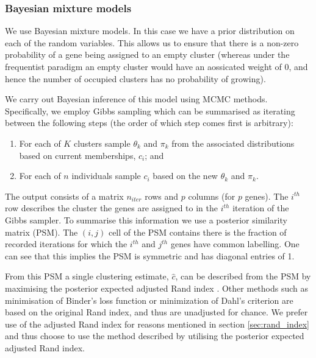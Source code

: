 \documentclass[12pt]{article} %
\begin{document}
	\subsubsection{Bayesian mixture models}
	We use Bayesian mixture models. In this case we have a prior distribution on each of the random variables. This allows us to ensure that there is a non-zero probability of a gene being assigned to an empty cluster (whereas under the frequentist paradigm an empty cluster would have an aossicated weight of 0, and hence the number of occupied clusters has no probability of growing). 
	
	We carry out Bayesian inference of this model using MCMC methods. Specifically, we employ Gibbs sampling which can be summarised as iterating between the following steps (the order of which step comes first is arbitrary):
	\begin{enumerate}
		\item For each of $K$ clusters sample $\theta_k$ and $\pi_k$ from the associated distributions based on current memberships, $c_i$; and
		\item For each of $n$ individuals sample $c_i$ based on the new $\theta_k$ and $\pi_k$.
	\end{enumerate}
	The output consists of a matrix $n_{iter}$ rows and $p$ columns (for $p$ genes). The $i^{th}$ row describes the cluster the genes are assigned to in the $i^{th}$ iteration of the Gibbs sampler. To summarise this information we use a posterior similarity matrix (PSM). The $(i,j)$ cell of the PSM contains there is the fraction of recorded iterations for which the $i^{th}$ and $j^{th}$ genes have common labelling. One can see that this implies the PSM is symmetric and has diagonal entries of 1.
	
	From this PSM a single clustering estimate, $\hat{c}$, can be described from the PSM by maximising the posterior expected adjusted Rand index \cite{FritschImprovedcriteriaclustering2009}. Other methods such as minimisation of Binder's loss function or  minimization of Dahl’s criterion are based on the original Rand index, and thus are unadjusted for chance. We prefer use of the adjusted Rand index for reasons mentioned in section \ref{sec:rand_index} and thus choose to use the method described by \citet{FritschImprovedcriteriaclustering2009} utilising the  posterior expected adjusted Rand index.
	
\end{document}
